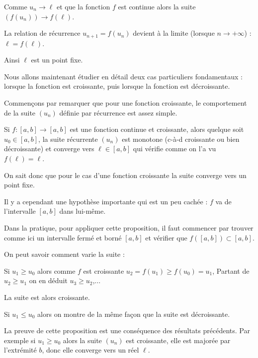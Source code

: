 \change

Comme $u_n\to \ell$ et que la fonction $f$ est continue alors 
la suite $(f(u_n)) \to f(\ell)$.

\change

La relation de récurrence $u_{n+1} = f(u_n)$ devient à la limite (lorsque $n\to+\infty$) : $\ell=f(\ell)$.

Ainsi $\ell$ est un point fixe.

Nous allons maintenant étudier en détail deux cas particuliers fondamentaux : lorsque la fonction est croissante, 
puis lorsque la fonction est décroissante.



\diapo

Commençons par remarquer que pour une fonction croissante, le comportement de la suite 
$(u_n)$ définie par récurrence est assez simple.

Si $f : [a,b] \to [a,b]$ est une fonction continue et croissante, 
alors quelque soit $u_0 \in [a,b]$, la suite récurrente $(u_n)$ est
monotone (c-à-d croissante ou bien décroissante) et converge vers $\ell \in [a,b]$ qui vérifie comme on l'a vu 
$f(\ell)=\ell$.

On sait donc que pour le cas d'une fonction croissante la suite converge vers un point fixe.

\change

Il y a cependant  une hypothèse importante qui est un peu cachée : $f$ va de l'intervalle $[a,b]$ dans
lui-même.

\change

Dans la pratique, pour appliquer cette proposition, il faut commencer par trouver comme ici un intervalle fermé et borné
$[a,b]$ et vérifier que $f([a,b]) \subset [a,b]$.

\change

On peut savoir comment varie la suite :

Si $u_1\ge u_0$ alors comme $f$ est croissante $u_2 = f(u_1)\ge f(u_0)=u_1$,
Partant de $u_2\ge u_1$ on en déduit $u_3 \ge u_2$,...

La suite  est alors croissante.
 
 
\change

 Si $u_1 \le u_0$ alors on montre de la même façon que la suite est décroissante.
 
 \change
 

La preuve de cette proposition est une conséquence des résultats précédents. 
Par exemple si $u_1\ge u_0$ alors la suite $(u_n)$ est croissante, elle est majorée par 
l'extrémité $b$, donc elle converge vers un réel $\ell$. 

